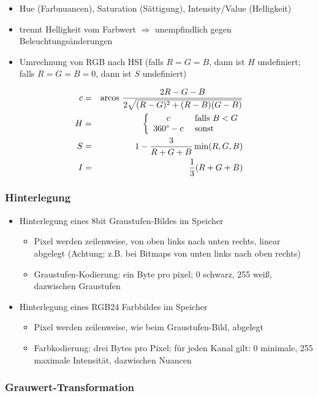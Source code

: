 \begin{itemize}
\item Hue (Farbnuancen), Saturation (Sättigung), Intensity/Value (Helligkeit)
\item trennt Helligkeit vom Farbwert $\Rightarrow$ unempfindlich gegen Beleuchtungsänderungen
\item Umrechnung von RGB nach HSI (falls $R=G=B$, dann ist $H$ undefiniert; falls $R=G=B=0$, dann ist $S$ undefiniert)
\end{itemize}
\begin{eqnarray*}
c &=& \textrm{arcos } \frac{2R - G - B}{2 \sqrt{(R-G)^2 + (R-B)(G-B)}} \\
H &=& \left\{ \begin{array}{cl} c & \textrm{ falls } B < G \\ 360\degree - c & \textrm{ sonst} \end{array} \right. \\
S &=& 1 - \frac{3}{R+G+B} \min (R,G,B) \\
I &=& \frac{1}{3} (R + G + B)
\end{eqnarray*}

\subsubsection*{Hinterlegung}

\begin{itemize}
\item Hinterlegung eines 8bit Graustufen-Bildes im Speicher
\begin{itemize}
\item Pixel werden zeilenweise, von oben links nach unten rechts, linear abgelegt (Achtung: z.B. bei Bitmaps von unten links nach oben rechts)
\item Graustufen-Kodierung: ein Byte pro pixel; 0 schwarz, 255 weiß, dazwischen Graustufen
\end{itemize}
\item Hinterlegung eines RGB24 Farbbildes im Speicher
\begin{itemize}
\item Pixel werden zeilenweise, wie beim Graustufen-Bild, abgelegt
\item Farbkodierung: drei Bytes pro Pixel; für jeden Kanal gilt: 0 minimale, 255 maximale Intensität, dazwischen Nuancen
\end{itemize}
\end{itemize}

\subsubsection*{Grauwert-Transformation}

